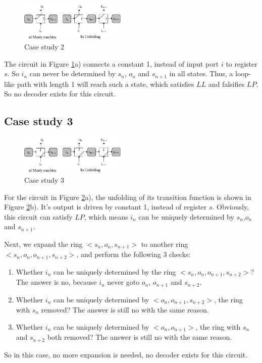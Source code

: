 \documentclass[journal]{IEEEtran}
\begin{document}
\begin{figure}[t]
\begin{center}
\includegraphics[width=0.45\textwidth]{c2}
\end{center}
\caption{Case study 2}
  \label{fig_case2}
\end{figure}

The circuit in Figure \ref{fig_case2}a) connects a constant 1,
instead of input port $i$ to register $s$.
So $i_n$ can never be determined by $s_n$, $o_n$ and $s_{n+1}$ in all states.
Thus,
a loop-like path with length 1 will reach such a state,
which satisfies $LL$ and falsifies $LP$.
So no decoder exists for this circuit.

\subsection{Case study 3}\label{subsec_case3}

\begin{figure}[b]
\begin{center}
\includegraphics[width=0.45\textwidth]{c3}
\end{center}
\caption{Case study 3}
  \label{fig_case3}
\end{figure}

For the circuit in Figure \ref{fig_case3}a),
the unfolding of its transition function is shown in Figure \ref{fig_case3}b).
It's output is driven by constant 1,
instead of register $s$.
Obviously,
this circuit can satisfy $LP$,
which means $i_n$ can be uniquely determined by $s_n$,$o_n$ and $s_{n+1}$.

Next,
we expand the ring $<s_n, o_n, s_{n+1}>$ to another ring $<s_n, o_n, o_{n+1}, s_{n+2}>$,
and perform the following 3 checks:
\begin{enumerate}
\item Whether $i_n$ can be uniquely determined by the ring $<s_n, o_n, o_{n+1}, s_{n+2}>$?
The answer is no,
because $i_n$ never goto $o_n$, $o_{n+1}$ and $s_{n+2}$.
\item Whether $i_n$ can be uniquely determined by $<o_n, o_{n+1}, s_{n+2}>$, the ring with $s_n$ removed?
The answer is still no with the same reason.
\item Whether $i_n$ can be uniquely determined by $<o_n, o_{n+1}>$, the ring with $s_n$ and $s_{n+2}$ both removed?
The answer is still no with the same reason.
\end{enumerate}
So in this case,
no more expansion is needed,
no decoder exists for this circuit.
\end{document}
